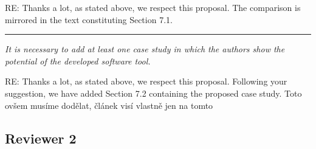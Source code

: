\documentclass{article}
\newcommand{\separator}{\rule{\textwidth}{0.4pt}}
\begin{document}
{RE: Thanks a lot, as stated above, we respect this proposal. The comparison is mirrored in the text constituting Section 7.1.}

\separator

{\it It is necessary to add at least one case study in which the authors show the potential of the developed software tool. }

{RE: Thanks a lot, as stated above, we respect this proposal. Following your suggestion, we have added Section 7.2 containing the proposed case study. {\color{red}Toto ovšem musíme dodělat, článek visí vlastně jen na tomto}}



\subsection{Reviewer 2}
\end{document}
